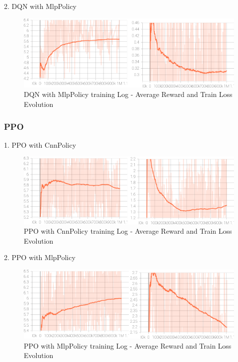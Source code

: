 2. DQN with MlpPolicy

\begin{figure}[H]
    \centering
    \includegraphics[height=0.20\textheight]{images/dqn_mlp.png} 
    \caption{DQN with MlpPolicy training Log - Average Reward and Train Loss Evolution}
\end{figure}

\subsubsection{PPO}

1. PPO with CnnPolicy

\begin{figure}[H]
    \centering
    \includegraphics[height=0.20\textheight]{images/ppo_cnn.png} 
    \caption{PPO with CnnPolicy training Log - Average Reward and Train Loss Evolution}
\end{figure}



2. PPO with MlpPolicy

\begin{figure}[H]
    \centering
    \includegraphics[height=0.20\textheight]{images/ppo_mlp.png} 
    \caption{PPO with MlpPolicy training Log - Average Reward and Train Loss Evolution}
\end{figure}



